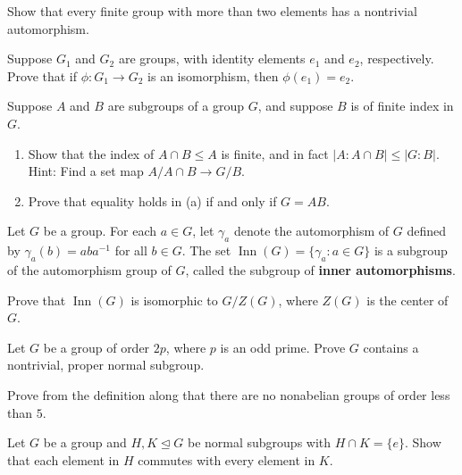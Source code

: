 \documentclass[11pt,twoside,openany]{memoir}
\begin{document}
        \begin{exercise}
        Show that every finite group with more than two elements has a nontrivial automorphism.
        \end{exercise}
        
        \begin{exercise}
        Suppose $G_1$ and $G_2$ are groups, with identity elements $e_1$ and $e_2$, respectively. Prove that if $\phi:G_1\to G_2$ is an isomorphism, then $\phi(e_1)=e_2$.
        \end{exercise}
        
        \begin{exercise}
        Suppose $A$ and $B$ are subgroups of a group $G$, and suppose $B$ is of finite index in $G$.
        \begin{enumerate}[topsep=0.1in,label=(\alph*)]
            \item Show that the index of $A\cap B\le A$ is finite, and in fact $|A:A\cap B|\le |G:B|$. {Hint:} Find a set map $A/A\cap B\to G/B$.
            \item Prove that equality holds in (a) if and only if $G=AB$.
        \end{enumerate}
        \end{exercise}
        
        \begin{exercise}
        Let $G$ be a group. For each $a\in G$, let $\gamma_a$ denote the automorphism of $G$ defined by $\gamma_a(b)=aba^{-1}$ for all $b\in G$. The set $\operatorname{Inn}(G)=\{\gamma_a:a\in G\}$ is a subgroup of the automorphism group of $G$, called the subgroup of \textbf{inner automorphisms}.
        
        \medskip
        Prove that $\operatorname{Inn}(G)$ is isomorphic to $G/Z(G)$, where $Z(G)$ is the center of $G$.
        \end{exercise}
        
        \begin{exercise}
        Let $G$ be a group of order $2p$, where $p$ is an odd prime. Prove $G$ contains a nontrivial, proper normal subgroup.
        \end{exercise}
        
        \begin{exercise}
        Prove from the definition along that there are no nonabelian groups of order less than $5$.
        \end{exercise}
        
        \begin{exercise}
        Let $G$ be a group and $H,K\mathrel{\unlhd}G$ be normal subgroups with $H\cap K=\{e\}$. Show that each element in $H$ commutes with every element in $K$.
        \end{exercise}
        
\end{document}
